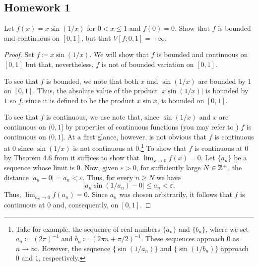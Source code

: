 \subsection{Homework 1}
\begin{problem}
Let $f(x)=x\sin(1/x)$ for $0<x\leq 1$ and $f(0)=0$. Show that $f$ is
bounded and continuous on $[0,1]$, but that $V[f;0,1]=+\infty$.
\end{problem}
\begin{proof}
  Set $f\coloneq x\sin (1/x)$. We will show that $f$ is bounded and
  continuous on $[0,1]$ but that, nevertheless, $f$ is not of bounded
  variation on $[0,1]$.

  To see that $f$ is bounded, we note that both $x$ and $\sin(1/x)$ are
  bounded by $1$ on $[0,1]$. Thus, the absolute value of the product
  $|{x\sin(1/x)}|$ is bounded by $1$ so $f$, since it is defined to be the
  product $x\sin x$, is bounded on $[0,1]$.

  To see that $f$ is continuous, we use note that, since $\sin(1/x)$ and
  $x$ are continuous on $(0,1]$ by properties of continuous functions (you
  may refer to \cite[Ch.\@ 4, p.\@ 87]{rudin-1}) $f$ is continuous on
  $(0,1]$. At a first glance, however, is not obvious that $f$ is
  continuous at $0$ since $\sin(1/x)$ is not continuous at
  $0$.\footnote{Take for example, the sequence of real numbers $\{a_n\}$
    and $\{b_n\}$, where we set $a_n\coloneq (2\pi)^{-1}$ and
    $b_n\coloneq (2\pi n+\pi/2)^{-1}$. These sequences approach $0$ as
    $n\to\infty$. However, the sequence $\{\sin(1/a_n)\}$ and
    $\{\sin(1/b_n)\}$ approach $0$ and $1$, respectively.} To show that $f$
  is continuous at $0$ by Theorem 4.6 from \cite[Ch.\@ 4, p.\@
  86]{rudin-1} it suffices to show that $\lim_{x\to 0}f(x)=0$. Let
  $\{a_n\}$ be a sequence whose limit is $0$. Now, given $\varepsilon>0$,
  for sufficiently large $N\in\mathbb{Z}^+$, the distance
  $|a_n-0|=a_n<\varepsilon$. Thus, for every $n\geq N$ we have
  \begin{equation}
    \label{eq:1:1}
    |{a_n\sin(1/a_n)-0}|\leq
    a_n<\varepsilon.
  \end{equation}
  Thus, $\lim_{a_n\to 0}f(a_n)=0$. Since $a_n$ was chosen arbitrarily, it
  follows that $f$ is continuous at $0$ and, consequently, on
  $[0,1]$.


\end{proof}
